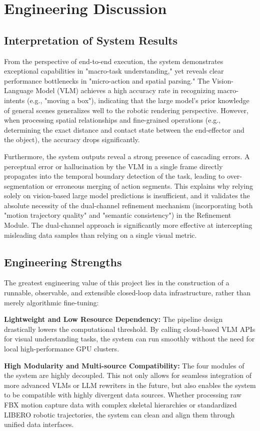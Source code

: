 \documentclass[11pt,oneside]{report}
\begin{document}
\chapter{Engineering Discussion}

\section{Interpretation of System Results}
From the perspective of end-to-end execution, the system demonstrates exceptional capabilities in "macro-task understanding," yet reveals clear performance bottlenecks in "micro-action and spatial parsing." The Vision-Language Model (VLM) achieves a high accuracy rate in recognizing macro-intents (e.g., "moving a box"), indicating that the large model's prior knowledge of general scenes generalizes well to the robotic rendering perspective. However, when processing spatial relationships and fine-grained operations (e.g., determining the exact distance and contact state between the end-effector and the object), the accuracy drops significantly.

Furthermore, the system outputs reveal a strong presence of cascading errors. A perceptual error or hallucination by the VLM in a single frame directly propagates into the temporal boundary detection of the task, leading to over-segmentation or erroneous merging of action segments. This explains why relying solely on vision-based large model predictions is insufficient, and it validates the absolute necessity of the dual-channel refinement mechanism (incorporating both "motion trajectory quality" and "semantic consistency") in the Refinement Module. The dual-channel approach is significantly more effective at intercepting misleading data samples than relying on a single visual metric.

\section{Engineering Strengths}
The greatest engineering value of this project lies in the construction of a runnable, observable, and extensible closed-loop data infrastructure, rather than merely algorithmic fine-tuning:

\textbf{Lightweight and Low Resource Dependency:} The pipeline design drastically lowers the computational threshold. By calling cloud-based VLM APIs for visual understanding tasks, the system can run smoothly without the need for local high-performance GPU clusters.

\textbf{High Modularity and Multi-source Compatibility:} The four modules of the system are highly decoupled. This not only allows for seamless integration of more advanced VLMs or LLM rewriters in the future, but also enables the system to be compatible with highly divergent data sources. Whether processing raw FBX motion capture data with complex skeletal hierarchies or standardized LIBERO robotic trajectories, the system can clean and align them through unified data interfaces.
\end{document}
